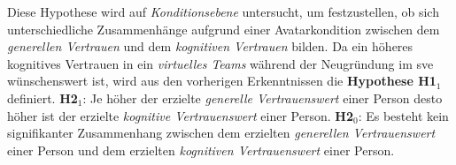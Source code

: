 \documentclass[a4paper,11pt]{article}%
\renewcommand{\\}{\vspace*{0.5\baselineskip} \newline}
\begin{document}
Diese Hypothese wird auf \textit{Konditionsebene} untersucht, um festzustellen, ob sich unterschiedliche Zusammenhänge aufgrund einer Avatarkondition zwischen dem \textit{generellen Vertrauen} und dem \textit{kognitiven Vertrauen} bilden.
Da ein höheres kognitives Vertrauen in ein \textit{virtuelles Teams} während der Neugründung im \ac{sve} wünschenswert ist, wird aus den vorherigen Erkenntnissen die \textbf{Hypothese H1$_{1}$} definiert.\\
\textbf{H2$_{1}$}: Je höher der erzielte \textit{generelle Vertrauenswert} einer Person desto höher ist der erzielte \textit{kognitive Vertrauenswert} einer Person. \newline
\textbf{H2$_{0}$}: Es besteht kein signifikanter Zusammenhang zwischen dem erzielten \textit{generellen Vertrauenswert} einer Person und dem erzielten \textit{kognitiven Vertrauenswert} einer Person.


\end{document}
